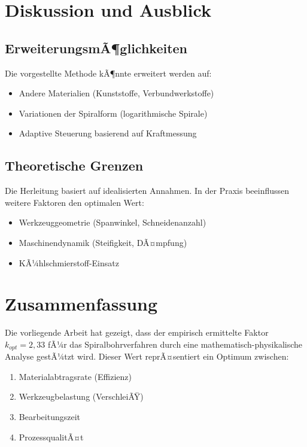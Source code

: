 ﻿\documentclass[12pt,a4paper]{article}
\begin{document}
\section{Diskussion und Ausblick}

\subsection{ErweiterungsmÃ¶glichkeiten}

Die vorgestellte Methode kÃ¶nnte erweitert werden auf:
\begin{itemize}
	\item Andere Materialien (Kunststoffe, Verbundwerkstoffe)
	\item Variationen der Spiralform (logarithmische Spirale)
	\item Adaptive Steuerung basierend auf Kraftmessung
\end{itemize}

\subsection{Theoretische Grenzen}

Die Herleitung basiert auf idealisierten Annahmen. In der Praxis beeinflussen weitere Faktoren den optimalen Wert:
\begin{itemize}
	\item Werkzeuggeometrie (Spanwinkel, Schneidenanzahl)
	\item Maschinendynamik (Steifigkeit, DÃ¤mpfung)
	\item KÃ¼hlschmierstoff-Einsatz
\end{itemize}

\section{Zusammenfassung}

Die vorliegende Arbeit hat gezeigt, dass der empirisch ermittelte Faktor $k_{opt} = 2{,}33$ fÃ¼r das Spiralbohrverfahren durch eine mathematisch-physikalische Analyse gestÃ¼tzt wird. Dieser Wert reprÃ¤sentiert ein Optimum zwischen:

\begin{enumerate}
	\item Materialabtragsrate (Effizienz)
	\item Werkzeugbelastung (VerschleiÃŸ)
	\item Bearbeitungszeit
	\item ProzessqualitÃ¤t
\end{enumerate}
\end{document}
